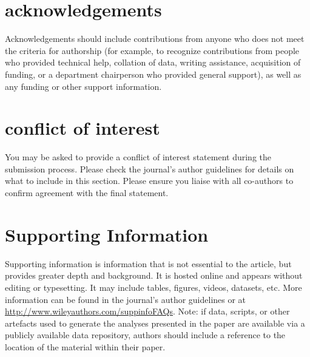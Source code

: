 \section*{acknowledgements}
Acknowledgements should include \cite{levinson_1983} contributions from anyone who does not meet the criteria for authorship (for example, to recognize contributions from people who provided technical help, collation of data, writing assistance, acquisition of funding, or a department chairperson who provided general support), as well as any funding or other support information.

\section*{conflict of interest}
You may be asked to provide a conflict of interest statement during the submission process. Please check the journal's author guidelines for details on what to include in this section. Please ensure you liaise with all co-authors to confirm agreement with the final statement.

\section*{Supporting Information}

Supporting information is information that is not essential to the article, but provides greater depth and background. It is hosted online and appears without editing or typesetting. It may include tables, figures, videos, datasets, etc. More information can be found in the journal's author guidelines or at \url{http://www.wileyauthors.com/suppinfoFAQs}. Note: if data, scripts, or other artefacts used to generate the analyses presented in the paper are available via a publicly available data repository, authors should include a reference to the location of the material within their paper.
